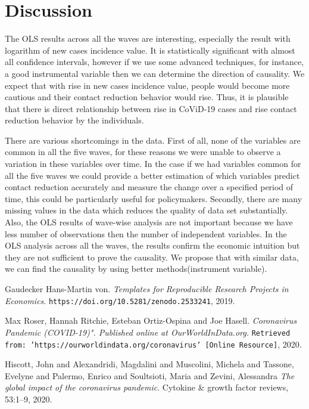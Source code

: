 \documentclass[11pt, a4paper, leqno]{article}
\begin{document}
 


\section{Discussion}
The OLS results across all the waves are interesting, especially the result with logarithm of new cases incidence value. It is statistically significant with almost all confidence intervals, however if we use some advanced techniques, for instance, a good instrumental variable then we can determine the direction of causality. We expect that with rise in new cases incidence value, people would become more cautious and their contact reduction behavior would rise. Thus, it is plausible that there is direct relationship between rise in CoViD-19 cases and rise contact reduction behavior by the individuals.

There are various shortcomings in the data. First of all, none of the variables are common in all the five waves, for these reasons we were unable to observe a variation in these variables over time. In the case if we had variables common for all the five waves we could provide a better estimation of which variables predict contact reduction accurately and measure the change over a specified period of time, this could be particularly useful for policymakers. 
Secondly, there are many missing values in the data which reduces the quality of data set substantially. Also, the OLS results of wave-wise analysis are not important because we have less number of observations then the number of independent variables. In the OLS analysis across all the waves, the results confirm the economic intuition but they are not sufficient to prove the causality. We propose that with similar data, we can find the causality by using better methods(instrument variable).


\begin{thebibliography}{9}
Gaudecker Hans-Martin von. 
\textit{Templates for Reproducible Research Projects in Economics}. 
\texttt{https://doi.org/10.5281/zenodo.2533241}, 2019.

Max Roser, Hannah Ritchie, Esteban Ortiz-Ospina and Joe Hasell. \textit{Coronavirus Pandemic (COVID-19)". Published online at OurWorldInData.org.} 
\texttt{Retrieved from: 'https://ourworldindata.org/coronavirus' [Online Resource]}, 2020.

Hiscott, John and Alexandridi, Magdalini and Muscolini, Michela and Tassone, Evelyne and Palermo, Enrico and Soultsioti, Maria and Zevini, Alessandra
\textit{The global impact of the coronavirus pandemic}. 
Cytokine \& growth factor reviews, 53:1–9, 2020.

\end{thebibliography}
\end{document}
